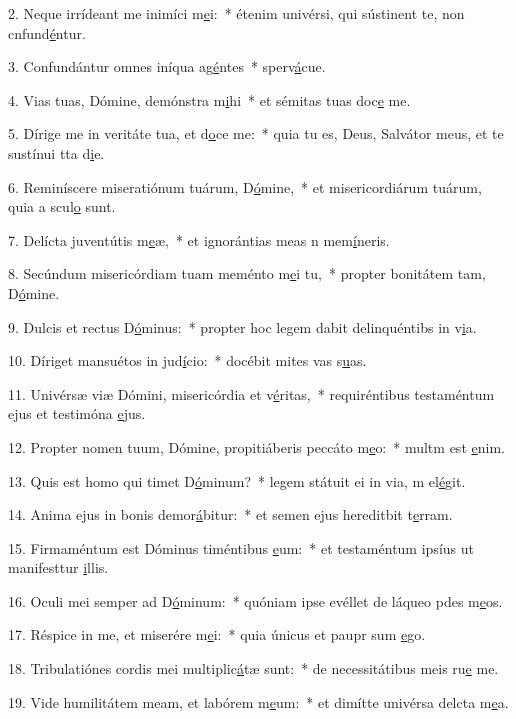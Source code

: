 2. Neque irrídeant me inimíci m\uline{e}i:~* étenim univérsi, qui sústinent te, non cnfund\uline{é}ntur.\par 
3. Confundántur omnes iníqua ag\uline{é}ntes~* sperv\uline{á}cue.\par 
4. Vias tuas, Dómine, demónstra m\uline{i}hi~* et sémitas tuas doc\uline{e} me.\par 
5. Dírige me in veritáte tua, et d\uline{o}ce me:~* quia tu es, Deus, Salvátor meus, et te sustínui tta d\uline{i}e.\par 
6. Reminíscere miseratiónum tuárum, D\uline{ó}mine,~* et misericordiárum tuárum, quia a scul\uline{o} sunt.\par 
7. Delícta juventútis m\uline{e}æ,~* et ignorántias meas n mem\uline{í}neris.\par 
8. Secúndum misericórdiam tuam meménto m\uline{e}i tu,~* propter bonitátem tam, D\uline{ó}mine.\par 
9. Dulcis et rectus D\uline{ó}minus:~* propter hoc legem dabit delinquéntibs in v\uline{i}a.\par 
10. Díriget mansuétos in jud\uline{í}cio:~* docébit mites vas s\uline{u}as.\par 
11. Univérsæ viæ Dómini, misericórdia et v\uline{é}ritas,~* requiréntibus testaméntum ejus et testimóna \uline{e}jus.\par 
12. Propter nomen tuum, Dómine, propitiáberis peccáto m\uline{e}o:~* multm est \uline{e}nim.\par 
13. Quis est homo qui timet D\uline{ó}minum?~* legem státuit ei in via, m el\uline{é}git.\par 
14. Anima ejus in bonis demor\uline{á}bitur:~* et semen ejus hereditbit t\uline{e}rram.\par 
15. Firmaméntum est Dóminus timéntibus \uline{e}um:~* et testaméntum ipsíus ut manifesttur \uline{i}llis.\par 
16. Oculi mei semper ad D\uline{ó}minum:~* quóniam ipse evéllet de láqueo pdes m\uline{e}os.\par 
17. Réspice in me, et miserére m\uline{e}i:~* quia únicus et paupr sum \uline{e}go.\par 
18. Tribulatiónes cordis mei multiplic\uline{á}tæ sunt:~* de necessitátibus meis ru\uline{e} me.\par 
19. Vide humilitátem meam, et labórem m\uline{e}um:~* et dimítte univérsa delcta m\uline{e}a.\par 
